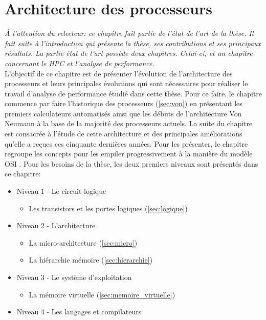 \chapter{Architecture des processeurs}
\label{chap:sota:materiel}
\minitoc

\textit{À l'attention du relecteur: ce chapitre fait partie de l'état de l'art de la thèse. Il fait suite à l'introduction qui présente la thèse, ses contributions et ses principaux résultats. La partie état de l'art possède deux chapitres. Celui-ci, et un chapitre concernant le HPC et l'analyse de performance.}\\


L'objectif de ce chapitre est de présenter l'évolution de l'architecture des processeurs et leurs principales évolutions qui sont nécessaires pour réaliser le travail d'analyse de performance étudié dans cette thèse. 
Pour ce faire, le chapitre commence par faire l'historique des processeurs (\autoref{sec:von}) en présentant les premiers calculateurs automatisés ainsi que les débuts de l'architecture Von Neumann à la base de la majorité des processeurs actuels. 
La suite du chapitre est consacrée à l'étude de cette architecture et des principales améliorations qu'elle a reçues ces cinquante dernières années. Pour les présenter, le chapitre regroupe les concepts pour les empiler progressivement à la manière du modèle OSI   \cite{day1983osi}. Pour les besoins de la thèse, les deux premiers niveaux sont présentés dans ce chapitre:
\begin{itemize}
    \item Niveau 1 - Le circuit logique 
        \begin{itemize}
        \item Les transistors et les portes logiques (\autoref{sec:logique})
        \end{itemize}
    \item Niveau 2 - L'architecture 
    \begin{itemize}
        \item La micro-architecture (\autoref{sec:micro})
        \item La hiérarchie mémoire (\autoref{sec:hierarchie})
    \end{itemize}
    \item Niveau 3 - Le système d'exploitation
        \begin{itemize}
            \item La mémoire virtuelle  (\autoref{sec:memoire_virtuelle})
        \end{itemize}
    \item Niveau 4 - Les langages et compilateurs
\end{itemize}

